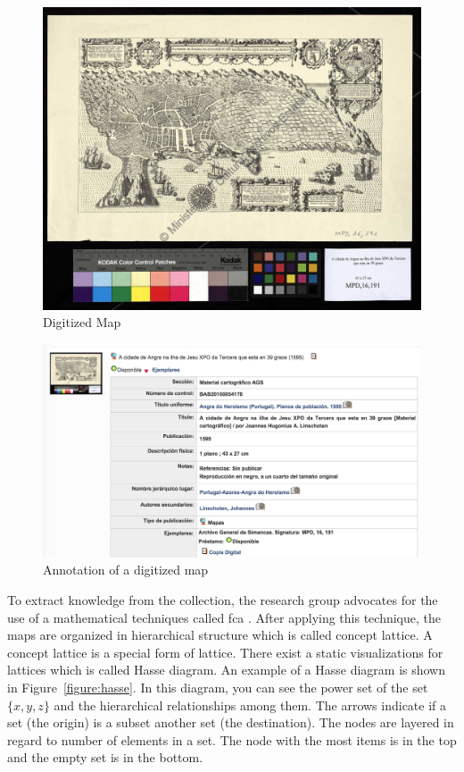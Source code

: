\documentclass[11pt]{report}
\begin{document}
\begin{figure}[!ht]
	\centering
	\includegraphics[width=\linewidth]{./images/map}
\caption{Digitized Map}
\label{figure:map}
\end{figure}

\begin{figure}[!ht]
	\centering
	\includegraphics[width=\linewidth]{./images/metadata}
\caption{Annotation of a digitized map}
\label{figure:metadata}
\end{figure}

To extract knowledge from the collection, the research group advocates for the use of a mathematical techniques called \acrlong{fca} \cite{Castellanos,Cigarran}. After applying this technique, the maps are organized in hierarchical structure which is called concept lattice. A concept lattice is a special form of lattice. There exist a static visualizations for lattices which is called Hasse diagram. An example of a Hasse diagram is shown in Figure~\ref{figure:hasse}. In this diagram, you can see the power set of the set $\{x,y,z\}$ and the hierarchical relationships among them. The arrows indicate if a set (the origin) is a subset another set (the destination). The nodes are layered in regard to number of elements in a set. The node with the most items is in the top and the empty set is in the bottom. \\
\end{document}
